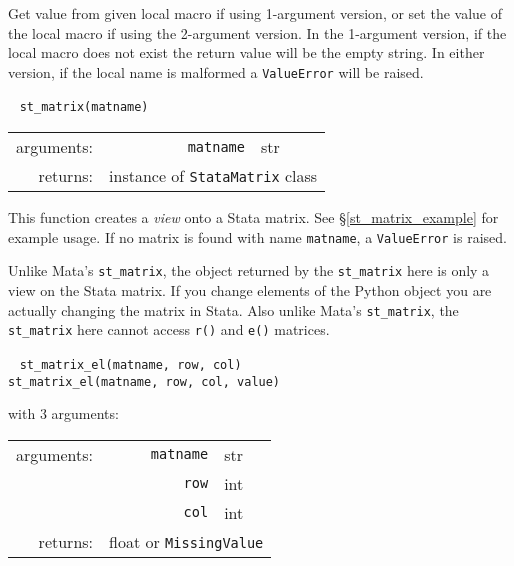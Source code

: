 \documentclass{article}
\begin{document}
			\vspace{1.5mm}
			\noindent Get value from given local macro if using 1-argument version, or set the value of the local macro if using the 2-argument version. In the 1-argument version, if the local macro does not exist the return value will be the empty string. In either version, if the local name is malformed a \lstinline{ValueError} will be raised. \newline
			
						
			\ \newline
			\noindent \lstinline$st_matrix(matname)$
								
			\vspace{1.5mm}
			\noindent 
			\indent \begin{tabular}{rrl}
					arguments: & \texttt{matname} & str \\
					returns: & \multicolumn{2}{l}{instance of \lstinline$StataMatrix$ class}
				\end{tabular}
								
			\vspace{1.5mm}
			\noindent This function creates a \emph{view} onto a Stata matrix. See \S\ref{st_matrix_example} for example usage. If no matrix is found with name \lstinline{matname}, a \lstinline{ValueError} is raised. 
			
			Unlike Mata's \lstinline{st_matrix}, the object returned by the \lstinline{st_matrix} here is only a view on the Stata matrix. If you change elements of the Python object you are actually changing the matrix in Stata. Also unlike Mata's \lstinline{st_matrix}, the \lstinline{st_matrix} here cannot access \lstinline{r()} and \lstinline{e()} matrices. \newline
			
			
			\ \newline
			\noindent \lstinline$st_matrix_el(matname, row, col)$ \\
			\noindent \lstinline$st_matrix_el(matname, row, col, value)$
								
			\vspace{1.5mm}
			\noindent 
			\indent with 3 arguments:
			
			\indent \qquad \begin{tabular}{rrl}
					arguments: & \texttt{matname} & str \\
						& \texttt{row} & int \\
						& \texttt{col} & int \\
					returns: & \multicolumn{2}{l}{float or \lstinline$MissingValue$}
				\end{tabular}
				
\end{document}
